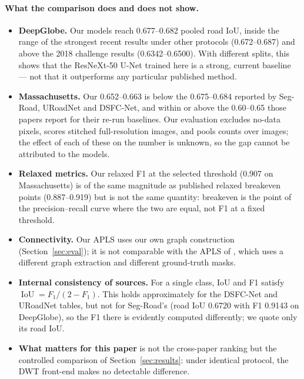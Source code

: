 \documentclass[11pt]{article}
\newcommand{\IoU}{\operatorname{IoU}}
\begin{document}
\paragraph{What the comparison does and does not show.}
\begin{itemize}
  \item \textbf{DeepGlobe.} Our models reach 0.677--0.682 pooled road IoU, inside the range of the
        strongest recent results under other protocols (0.672--0.687) and above the 2018 challenge
        results (0.6342--0.6500). With different splits, this shows that the ResNeXt-50 U-Net
        trained here is a strong, current baseline --- not that it outperforms any particular
        published method.
  \item \textbf{Massachusetts.} Our 0.652--0.663 is below the 0.675--0.684 reported by Seg-Road,
        URoadNet and DSFC-Net, and within or above the 0.60--0.65 those papers report for their
        re-run baselines. Our evaluation excludes no-data pixels, scores stitched full-resolution images,
        and pools counts over images; the effect of each of these on the number is unknown, so the
        gap cannot be attributed to the models.
  \item \textbf{Relaxed metrics.} Our relaxed F1 at the selected threshold (0.907 on Massachusetts)
        is of the same magnitude as published relaxed breakeven points (0.887--0.919) but is not the
        same quantity: breakeven is the point of the precision--recall curve where the two are
        equal, not F1 at a fixed threshold.
  \item \textbf{Connectivity.} Our APLS uses our own graph construction (Section~\ref{sec:eval}); it
        is not comparable with the APLS of \cite{batra2019}, which uses a different graph
        extraction and different ground-truth masks.
  \item \textbf{Internal consistency of sources.} For a single class, IoU and F1 satisfy
        $\IoU = F_1/(2-F_1)$. This holds approximately for the DSFC-Net and URoadNet tables, but not
        for Seg-Road's (road IoU 0.6720 with F1 0.9143 on DeepGlobe), so the F1 there is evidently
        computed differently; we quote only its road IoU.
  \item \textbf{What matters for this paper} is not the cross-paper ranking but the controlled
        comparison of Section~\ref{sec:results}: under identical protocol, the DWT front-end makes
        no detectable difference.
\end{itemize}
\end{document}

